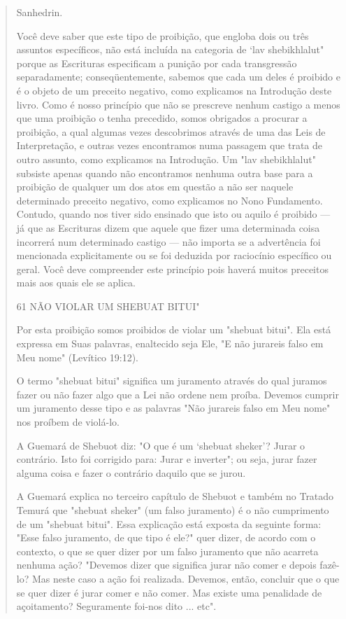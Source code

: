\begin{quote}
Sanhedrin.

Você deve saber que este tipo de proibição, que engloba dois ou três
assuntos específicos, não está incluída na categoria de `lav
shebikhlalut" por­que as Escrituras especificam a punição por cada
transgressão separadamente; conseqüentemente, sabemos que cada um deles
é proibido e é o objeto de um preceito negativo, como explicamos na
Introdução deste livro. Como é nosso princípio que não se prescreve
nenhum castigo a menos que uma proibição o tenha precedido, somos
obrigados a procurar a proibição, a qual algumas ve­zes descobrimos
através de uma das Leis de Interpretação, e outras vezes en­contramos
numa passagem que trata de outro assunto, como explicamos na
In­trodução. Um "lav shebikhlalut" subsiste apenas quando não
encontramos ne­nhuma outra base para a proibição de qualquer um dos atos
em questão a não ser naquele determinado preceito negativo, como
explicamos no Nono Funda­mento. Contudo, quando nos tiver sido ensinado
que isto ou aquilo é proibido --- já que as Escrituras dizem que aquele
que fizer uma determinada coisa incor­rerá num determinado castigo ---
não importa se a advertência foi mencionada explicitamente ou se foi
deduzida por raciocínio específico ou geral. Você de­ve compreender este
princípio pois haverá muitos preceitos mais aos quais ele se aplica.

61 NÃO VIOLAR UM SHEBUAT BITUI"

Por esta proibição somos proibidos de violar um "shebuat bitui". Ela
está expressa em Suas palavras, enaltecido seja Ele, "E não jurareis
falso em Meu nome" (Levítico 19:12).

O termo "shebuat bitui" significa um juramento através do qual ju­ramos
fazer ou não fazer algo que a Lei não ordene nem proíba. Devemos
cum­prir um juramento desse tipo e as palavras "Não jurareis falso em
Meu nome" nos proíbem de violá-lo.

A Guemará de Shebuot diz: "O que é um `shebuat sheker'? Jurar o
contrário. Isto foi corrigido para: Jurar e inverter"; ou seja, jurar
fazer alguma coisa e fazer o contrário daquilo que se jurou.

A Guemará explica no terceiro capítulo de Shebuot e também no Tra­tado
Temurá que "shebuat sheker" (um falso juramento) é o não cumprimento de
um "shebuat bitui". Essa explicação está exposta da seguinte forma:
"Esse falso juramento, de que tipo é ele?" quer dizer, de acordo com o
contexto, o que se quer dizer por um falso juramento que não acarreta
nenhuma ação? "Devemos dizer que significa jurar não comer e depois
fazê-lo? Mas neste caso a ação foi realizada. Devemos, então, concluir
que o que se quer dizer é jurar comer e não comer. Mas existe uma
penalidade de açoitamento? Seguramente foi-nos dito ... etc".
\end{quote}

